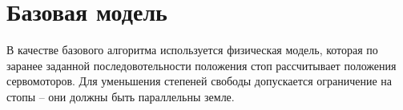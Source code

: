 \chapter{Базовая модель}\label{ch:ch3}
В качестве базового алгоритма используется физическая модель, которая по заранее заданной последовотельности положения стоп рассчитывает положения сервомоторов. Для уменьшения степеней свободы допускается ограничение на стопы – они должны быть параллельны земле.